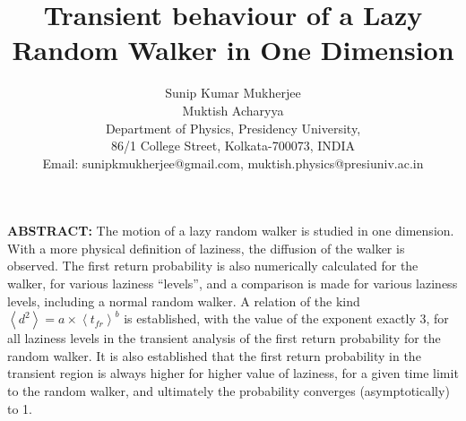 \message{ !name(paper.tex)}\documentclass{article}
\title{\textbf{Transient behaviour of a Lazy Random Walker in One Dimension}}
\author{Sunip Kumar Mukherjee \\ Muktish Acharyya \\ Department of Physics, Presidency University, \\ 86/1 College Street, Kolkata-700073, INDIA \\ Email: sunipkmukherjee@gmail.com, muktish.physics@presiuniv.ac.in}
\begin{document}

\maketitle
\textbf{ABSTRACT: }The motion of a lazy random walker is studied in one dimension. With a more physical definition of laziness, the diffusion of the walker is observed. The first return probability is also numerically calculated for the walker, for various laziness ``levels'', and a comparison is made for various laziness levels, including a normal random walker. A relation of the kind $\left \langle d^2 \right \rangle = a\times \left \langle t_{fr} \right \rangle ^b$ is established, with the value of the exponent exactly 3, for all laziness levels in the transient analysis of the first return probability for the random walker. It is also established that the first return probability in the transient region is always higher for higher value of laziness, for a given time limit to the random walker, and ultimately the probability converges (asymptotically) to 1.
\end{document}
